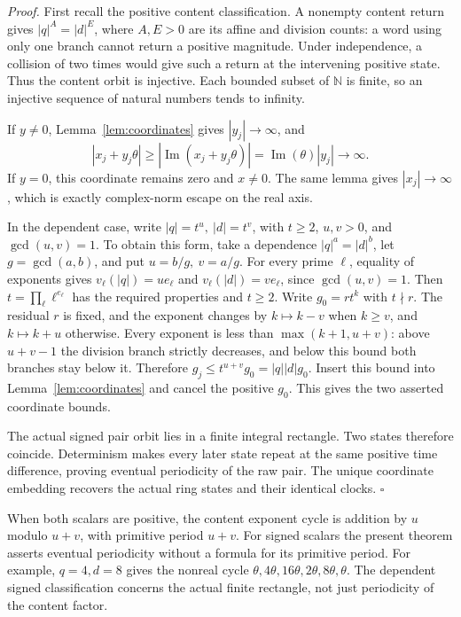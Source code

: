 \documentclass[11pt,letterpaper]{article}
\newcommand{\N}{\mathbb{N}}
\newenvironment{proof}{\noindent\textit{Proof.}}{\hfill\(\square\)}
\begin{document}
\begin{proof}
First recall the positive content classification. A nonempty content return gives
\(|q|^A=|d|^E\), where \(A,E>0\) are its affine and division counts:
a word using only one branch cannot return a positive magnitude.
Under independence, a collision of two times would give such a return at the intervening positive state.
Thus the content orbit is injective. Each bounded subset of \(\N\) is finite, so an injective sequence of natural numbers tends to infinity.

If \(y\ne0\), Lemma~\ref{lem:coordinates} gives \(|y_j|\to\infty\), and
\[
|x_j+y_j\theta|\ge |\operatorname{Im}(x_j+y_j\theta)|
=\operatorname{Im}(\theta)|y_j|\longrightarrow\infty.
\]
If \(y=0\), this coordinate remains zero and \(x\ne0\).
The same lemma gives \(|x_j|\to\infty\), which is exactly complex-norm escape on the real axis.

In the dependent case, write \(|q|=t^u,\ |d|=t^v\), with \(t\ge2\), \(u,v>0\), and \(\gcd(u,v)=1\).
To obtain this form, take a dependence \(|q|^a=|d|^b\), let \(g=\gcd(a,b)\), and put \(u=b/g,\ v=a/g\).
For every prime \(\ell\), equality of exponents gives \(v_\ell(|q|)=u e_\ell\) and \(v_\ell(|d|)=v e_\ell\), since \(\gcd(u,v)=1\).
Then \(t=\prod_\ell\ell^{e_\ell}\) has the required properties and \(t\ge2\).
Write \(g_0=rt^k\) with \(t\nmid r\).
The residual \(r\) is fixed, and the exponent changes by
\(k\mapsto k-v\) when \(k\ge v\), and \(k\mapsto k+u\) otherwise.
Every exponent is less than \(\max(k+1,u+v)\):
above \(u+v-1\) the division branch strictly decreases, and below this bound both branches stay below it.
Therefore \(g_j\le t^{u+v}g_0=|q||d|g_0\).
Insert this bound into Lemma~\ref{lem:coordinates} and cancel the positive \(g_0\).
This gives the two asserted coordinate bounds.

The actual signed pair orbit lies in a finite integral rectangle.
Two states therefore coincide. Determinism makes every later state repeat at the same positive time difference, proving eventual periodicity of the raw pair.
The unique coordinate embedding recovers the actual ring states and their identical clocks.
\end{proof}

When both scalars are positive, the content exponent cycle is addition by \(u\) modulo \(u+v\), with primitive period \(u+v\).
For signed scalars the present theorem asserts eventual periodicity without a formula for its primitive period.
For example, \(q=4,d=8\) gives the nonreal cycle
\(\theta,4\theta,16\theta,2\theta,8\theta,\theta\).
The dependent signed classification concerns the actual finite rectangle, not just periodicity of the content factor.
\end{document}
